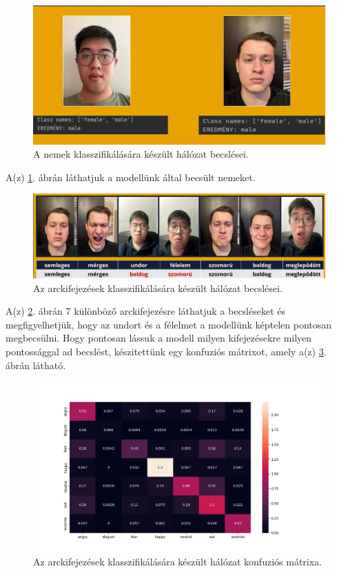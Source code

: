 \documentclass[12pt,a4]{article}
\begin{document}
    \begin{figure}[h]	
		\centering
		\includegraphics[width=1\linewidth]{gender}
        \caption{  A nemek klasszifikálására készült hálózat becslései.}
        \label{fig:gender}
	\end{figure}

    A(z) \ref{fig:gender}. ábrán láthatjuk a modellünk által becsült nemeket.

    \newpage
    \begin{figure}[h]	
		\centering
		\includegraphics[width=1\linewidth]{arcanalizis}
        \caption{  Az arckifejezések klasszifikálására készült hálózat becslései.}
        \label{fig:expr}
	\end{figure}

    A(z) \ref{fig:expr}. ábrán 7 különböző arckifejezésre láthatjuk a becsléseket és megfigyelhetjük, hogy az undort és a félelmet a modellünk képtelen pontosan megbecsülni. Hogy pontosan lássuk a modell milyen kifejezésekre milyen pontossággal ad becslést, készitettünk egy konfuziós mátrixot, amely a(z) \ref{fig:cfmatrix}. ábrán látható.

    \begin{figure}[h]	
		\centering
		\includegraphics[width=1\linewidth]{output_cf_matrix.png}
        \caption{  Az arckifejezések klasszifikálására készült hálózat konfuziós mátrixa.}
        \label{fig:cfmatrix}
	\end{figure}
    
\end{document}
